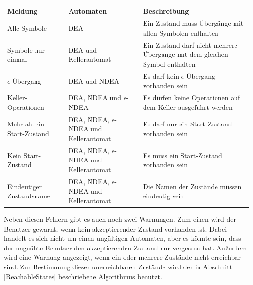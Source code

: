 \noindent
\begin{tabular}{|p{2.1cm}|p{2.7cm}|p{6.0cm}|}
  \hline
  \textbf{Meldung} &
  \textbf{Automaten} &
  \textbf{Beschreibung} \\
  \hline
  \hline
  Alle Symbole &
  DEA &
  Ein Zustand muss Übergänge mit allen Symbolen enthalten \\
  \hline
  Symbole nur einmal &
  DEA und Kellerautomat &
  Ein Zustand darf nicht mehrere Übergänge mit dem gleichen Symbol enthalten \\
  \hline
  $\epsilon$-Übergang &
  DEA und NDEA &
  Es darf kein $\epsilon$-Übergang vorhanden sein \\
  \hline
  Keller-Operationen &
  DEA, NDEA und $\epsilon$-NDEA &
  Es dürfen keine Operationen auf dem Keller ausgeführt werden \\
  \hline
  Mehr als ein Start-Zustand &
  DEA, NDEA, $\epsilon$-NDEA und Kellerautomat&
  Es darf nur ein Start-Zustand vorhanden sein \\
  \hline
  Kein Start-Zustand &
  DEA, NDEA, $\epsilon$-NDEA und Kellerautomat&
  Es muss ein Start-Zustand vorhanden sein \\
  \hline
  Eindeutiger Zustandsname &
  DEA, NDEA, $\epsilon$-NDEA und Kellerautomat&
  Die Namen der Zustände müssen eindeutig sein \\
  \hline
\end{tabular}
\vspace{10pt}

\noindent
Neben diesen Fehlern gibt es auch noch zwei Warnungen. Zum einen wird der
Benutzer gewarnt, wenn kein akzeptierender Zustand vorhanden ist. Dabei handelt
es sich nicht um einen ungültigen Automaten, aber es könnte sein, dass der
ungeübte Benutzer den akzeptierenden Zustand nur vergessen hat. Außerdem wird
eine Warnung angezeigt, wenn ein oder mehrere Zustände nicht erreichbar sind.
Zur Bestimmung dieser unerreichbaren Zustände wird der in Abschnitt
\ref{ReachableStates} beschriebene Algorithmus benutzt.\vspace{10pt}

